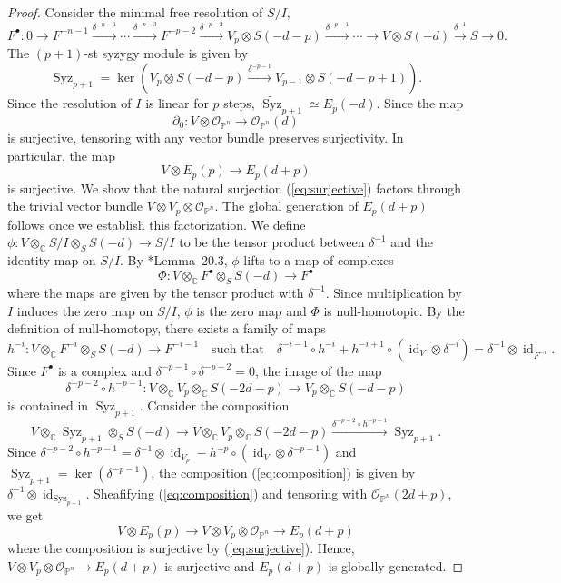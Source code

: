 \documentclass[11pt,letterpaper,reqno]{amsart}
\newcommand{\CC}{\mathbb{C}}
\renewcommand{\ker}{\operatorname{ker}}
\newcommand{\mc}[1]{\mathcal{#1}}
\def\PP{{\mathbb P}}
\def\lra{\longrightarrow}
\theoremstyle{definition}
\numberwithin{equation}{section}
\begin{document}
\begin{proof}
    Consider the minimal free resolution of $S/I$,
    \[F^\bullet \colon 0 \lra F^{-n-1} \overset{\delta^{-n-1}}{\lra} \cdots \overset{\delta^{-p-3}}{\lra} F^{-p-2} \overset{\delta^{-p-2}}{\lra} V_p \otimes S(-d-p) \overset{\delta^{-p-1}}{\lra} \cdots \lra V \otimes S(-d) \overset{\delta^{-1}}{\lra} S \lra 0.\]
    The $(p+1)$-st syzygy module is given by
    \[\operatorname{Syz}_{p+1} = \ker(V_p \otimes S(-d-p) \overset{\delta^{-p-1}}{\lra} V_{p-1}\otimes S(-d-p+1)).\]
    Since the resolution of $I$ is linear for $p$ steps, $\widetilde{\operatorname{Syz}}_{p+1} \simeq E_p (-d)$. Since the map
    \[\partial_0 \colon V \otimes \mc{O}_{\PP^n} \lra \mc{O}_{\PP^n}(d)\]
    is surjective, tensoring with any vector bundle preserves surjectivity. In particular, the map
    \begin{equation}\label{eq:surjective}
        V \otimes E_p(p)  \lra E_p (d+p)
    \end{equation}
    is surjective. We show that the natural surjection (\ref{eq:surjective}) factors through the trivial vector bundle $V \otimes V_p \otimes \mc{O}_{\PP^n}$. The global generation of $E_p(d+p)$ follows once we establish this factorization.
    We define $\phi \colon V \otimes_\CC S/I \otimes_S S(-d) \lra S/I$ to be the tensor product between $\delta^{-1}$ and the identity map on $S/I$. By \cite{eisenbud-CA}*{Lemma~20.3}, $\phi$ lifts to a map of complexes 
    \[\Phi \colon V \otimes_\CC F^\bullet \otimes_S S(-d) \lra F^\bullet\]
    where the maps are given by the tensor product with $\delta^{-1}$. Since multiplication by $I$ induces the zero map on $S/I$, $\phi$ is the zero map and $\Phi$ is null-homotopic. By the definition of null-homotopy, there exists a family of maps 
    \[h^{-i} \colon V \otimes_\CC F^{-i} \otimes_S S(-d) \lra F^{-i-1} \quad \text{such that} \quad \delta^{-i-1} \circ h^{-i} + h^{-i+1} \circ (\operatorname{id}_{V} \otimes \delta^{-i}) = \delta^{-1} \otimes \operatorname{id}_{F^{-i}}.\]
    Since $F^\bullet$ is a complex and $\delta^{-p-1} \circ \delta^{-p-2} = 0$, the image of the map 
    \[\delta^{-p-2} \circ h^{-p-1} \colon V \otimes_\CC V_p \otimes_\CC S(-2d-p) \lra V_p \otimes_\CC S(-d-p)\]
    is contained in $\operatorname{Syz}_{p+1}$. Consider the composition
    \begin{equation}\label{eq:composition}
        V \otimes_\CC \operatorname{Syz}_{p+1} \otimes_S S(-d) \lra V \otimes_\CC V_p \otimes_\CC S(-2d-p) \overset{\delta^{-p-2} \circ h^{-p-1}}{\lra} \operatorname{Syz}_{p+1}.
    \end{equation}
    Since $\delta^{-p-2} \circ h^{-p-1} = \delta^{-1} \otimes \operatorname{id}_{V_p} - h^{-p} \circ (\operatorname{id}_V \otimes \delta^{-p-1})$ and $\operatorname{Syz}_{p+1} = \ker(\delta^{-p-1})$, the composition (\ref{eq:composition}) is given by $\delta^{-1} \otimes \operatorname{id}_{\operatorname{Syz}_{p+1}}$. Sheafifying (\ref{eq:composition}) and tensoring with $\mc{O}_{\PP^n}(2d+p)$, we get
    \[V \otimes E_p (p) \lra V \otimes V_p \otimes \mc{O}_{\PP^n} \lra E_p(d+p) \]
    where the composition is surjective by (\ref{eq:surjective}). Hence, $V \otimes V_p \otimes \mc{O}_{\PP^n} \lra E_p(d+p)$ is surjective and $E_p(d+p)$ is globally generated.
\end{proof}
\end{document}

